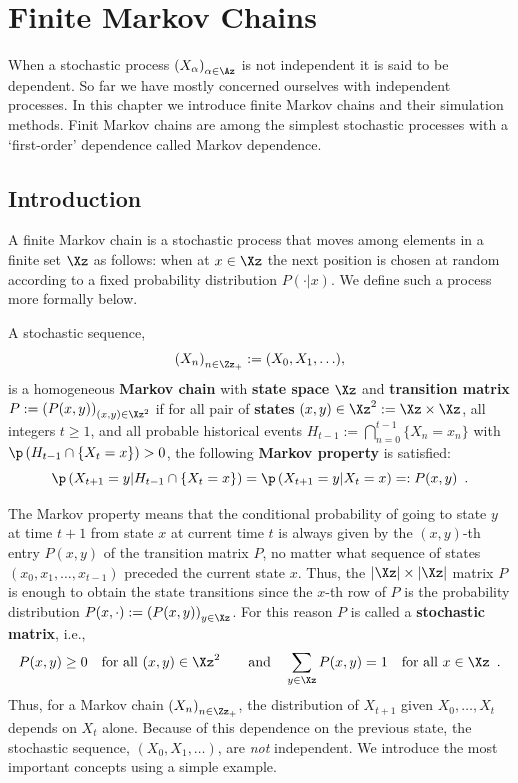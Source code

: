 \chapter{Finite Markov Chains}

When a stochastic process $\left(X_{\alpha} \right)_{\alpha \in \Az}$ is not independent it is said to be dependent.  
So far we have mostly concerned ourselves with independent processes.  
In this chapter we introduce finite Markov chains and their  simulation methods.
Finit Markov chains are among the simplest stochastic processes with a `first-order' dependence called Markov dependence.

\section{Introduction}\label{S:FiniteMCIntro}
A finite Markov chain is a stochastic process that moves among elements in a finite set $\Xz$ as follows: when at $x \in \Xz$ the next position is chosen at random according to a fixed probability distribution $P(\cdot | x)$.  We define such a process more formally below.

\begin{definition}\label{D:TimeHomFiniteMC}
A stochastic sequence, $$\left(X_n\right)_{n \in \Zz_+} := (X_0,X_1,\ldots),$$ is a homogeneous {\bf Markov chain} with {\bf state space} $\Xz$ and {\bf transition matrix} $P:=\left(P(x,y)\right)_{(x,y)\in \Xz^2}$ if for all pair of {\bf states} ${(x,y)\in \Xz^2 := \Xz \times \Xz}$, all integers $t \geq 1$, and all probable historical events $H_{t-1} := \bigcap_{n=0}^{t-1} \{ X_n = x_n \}$ with $\p \left(H_{t-1} \cap \{X_t = x\} \right) > 0$, the following {\bf Markov property} is satisfied: 
\begin{equation}\label{E:FiniteMarkovProperty}
\p\left(X_{t+1} = y | H_{t-1} \cap \{X_t = x\} \right)=\p\left(X_{t+1} = y | X_t = x \right) =: P(x,y) \enspace .
\end{equation}
\end{definition}
The Markov property means that the conditional probability of going to state $y$ at time $t+1$ from state $x$ at current time $t$ is always given by the $(x,y)$-th entry $P(x,y)$ of the transition matrix $P$, no matter what sequence of states $(x_0,x_1,\ldots,x_{t-1})$ preceded the current state $x$.  Thus, the $|\Xz| \times |\Xz|$ matrix $P$ is enough to obtain the state transitions since the $x$-th row of $P$ is the probability distribution $P(x,\cdot) := \left( P(x,y) \right)_{y \in \Xz}$.  For this reason $P$ is called a {\bf stochastic matrix}, i.e.,
\begin{equation}\label{E:StochasticMatrixConds}
P(x,y) \geq 0 \quad \text{for all } (x,y) \in \Xz^2 \qquad \text{and} \quad \sum_{y \in \Xz} P(x,y) = 1 \quad \text{for all } x \in \Xz \enspace .
\end{equation}
Thus, for a Markov chain $\left(X_n\right)_{n \in \Zz_+}$, the distribution of $X_{t+1}$ given $X_0,\ldots,X_t$  depends on $X_t$ alone. Because of this dependence on the previous state, the stochastic sequence, $(X_0,X_1,\ldots)$, are {\it not} independent.  We introduce the most important concepts using a simple example.

